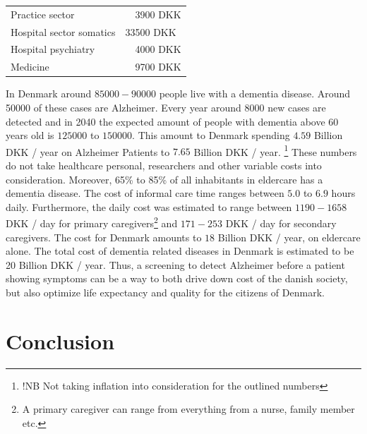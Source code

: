 \documentclass[12pt, fleqn, titlepage]{article}
\begin{document}
		
		\begin{table}[H]
			\begin{tabular}{ll}
				Practice sector   &\ \ 3900  DKK  \\
				Hospital sector somatics  & 33500 DKK \\
				Hospital psychiatry  &  \ \ 4000  DKK  \\
				Medicine & \ \ 9700  DKK 
			\end{tabular}
		\end{table}
		
		In Denmark around $ 85000-90000 $ people live with a dementia disease. Around 50000 of these cases are Alzheimer. Every year around $ 8000 $ new cases are detected and in 2040 the expected amount of people with dementia above 60 years old is $ 125000 $ to $ 150000 $. This amount to Denmark spending $ 4.59 $ Billion DKK / year on Alzheimer Patients to $ 7.65 $ Billion DKK / year. \footnote{!NB Not taking inflation into consideration for the outlined numbers} These numbers do not take healthcare personal, researchers and other variable costs into consideration. Moreover, 65\% to 85\% of all inhabitants in eldercare has a dementia disease. The cost of informal care time ranges between $ 5.0 $ to $ 6.9 $ hours daily. Furthermore, the daily cost was estimated to range between $ 1190 - 1658 $ DKK / day for primary caregivers\footnote{A primary caregiver can range from everything from a nurse, family member etc.} and $ 171 - 253 $ DKK / day for secondary caregivers. The cost for Denmark amounts to $ 18 $ Billion DKK / year, on eldercare alone. The total cost of dementia related diseases in Denmark is estimated to be 20 Billion DKK / year.  \cite{Alzheimerforeningen} \cite{informal_care} Thus, a screening to detect Alzheimer before a patient showing symptoms can be a way to both drive down cost of the danish society, but also optimize life expectancy and quality for the citizens of Denmark.
		


\section{Conclusion}\label{conclusion}
\end{document}
